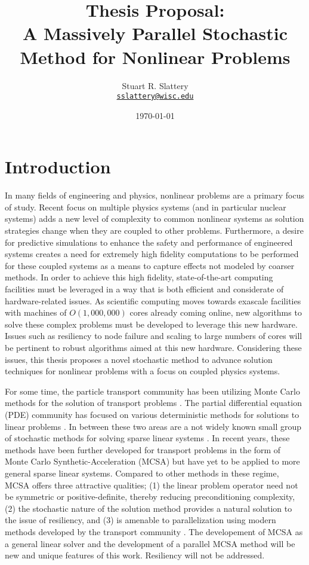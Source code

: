 \documentclass[letterpaper,12pt]{article}
\author{Stuart R. Slattery
\\ \href{mailto:sslattery@wisc.edu}{\texttt{sslattery@wisc.edu}}
}
\date{\today}
\title{Thesis Proposal:\\
  A Massively Parallel Stochastic Method for Nonlinear Problems}
\begin{document}
\maketitle

\section{Introduction}
In many fields of engineering and physics, nonlinear problems are a
primary focus of study. Recent focus on multiple physics systems (and
in particular nuclear systems) adds a new level of complexity to
common nonlinear systems as solution strategies change when they are
coupled to other problems. Furthermore, a desire for predictive
simulations to enhance the safety and performance of engineered
systems creates a need for extremely high fidelity computations to be
performed for these coupled systems as a means to capture effects not
modeled by coarser methods. In order to achieve this high fidelity,
state-of-the-art computing facilities must be leveraged in a way that
is both efficient and considerate of hardware-related issues. As
scientific computing moves towards exascale facilities with machines
of $O(1,000,000)$ cores already coming online, new algorithms to solve
these complex problems must be developed to leverage this new
hardware. Issues such as resiliency to node failure and scaling to
large numbers of cores will be pertinent to robust algorithms aimed at
this new hardware. Considering these issues, this thesis proposes a
novel stochastic method to advance solution techniques for nonlinear
problems with a focus on coupled physics systems.

For some time, the particle transport community has been utilizing
Monte Carlo methods for the solution of transport problems
\cite{Lewis_1993}. The partial differential equation (PDE) community
has focused on various deterministic methods for solutions to linear
problems \cite{Saad_2003}. In between these two areas are a not widely
known small group of stochastic methods for solving sparse linear
systems \cite{Hammersley_1964, Halton_1962, Halton_1994}. In recent
years, these methods have been further developed for transport
problems in the form of Monte Carlo Synthetic-Acceleration (MCSA)
\cite{Evans_2003, Evans_2009} but have yet to be applied to more
general sparse linear systems. Compared to other methods in these
regime, MCSA offers three attractive qualities; (1) the linear problem
operator need not be symmetric or positive-definite, thereby reducing
preconditioning complexity, (2) the stochastic nature of the
solution method provides a natural solution to the issue of resiliency,
and (3) is amenable to parallelization using modern methods developed by
the transport community \cite{Wagner_2011}. The developement of MCSA
as a general linear solver and the development of a parallel MCSA
method will be new and unique features of this work. Resiliency will
not be addressed.
\end{document}
